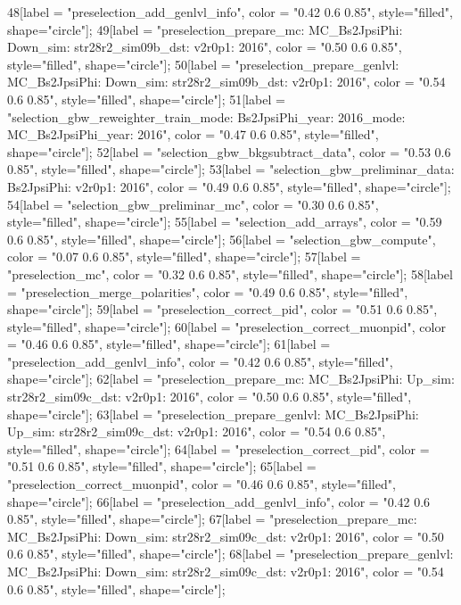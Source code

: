 {	48[label = "preselection_add_genlvl_info", color = "0.42 0.6 0.85", style="filled", shape="circle"];
	49[label = "preselection_prepare_mc\nmode: MC_Bs2JpsiPhi\npolarity: Down\nstrip_sim: str28r2_sim09b_dst\nversion: v2r0p1\nyear: 2016", color = "0.50 0.6 0.85", style="filled", shape="circle"];
	50[label = "preselection_prepare_genlvl\nmode: MC_Bs2JpsiPhi\npolarity: Down\nstrip_sim: str28r2_sim09b_dst\nversion: v2r0p1\nyear: 2016", color = "0.54 0.6 0.85", style="filled", shape="circle"];
	51[label = "selection_gbw_reweighter_train\ndata_mode: Bs2JpsiPhi\ndata_year: 2016\nmc_mode: MC_Bs2JpsiPhi\nmc_year: 2016", color = "0.47 0.6 0.85", style="filled", shape="circle"];
	52[label = "selection_gbw_bkgsubtract_data", color = "0.53 0.6 0.85", style="filled", shape="circle"];
	53[label = "selection_gbw_preliminar_data\nmode: Bs2JpsiPhi\nversion: v2r0p1\nyear: 2016", color = "0.49 0.6 0.85", style="filled", shape="circle"];
	54[label = "selection_gbw_preliminar_mc", color = "0.30 0.6 0.85", style="filled", shape="circle"];
	55[label = "selection_add_arrays", color = "0.59 0.6 0.85", style="filled", shape="circle"];
	56[label = "selection_gbw_compute", color = "0.07 0.6 0.85", style="filled", shape="circle"];
	57[label = "preselection_mc", color = "0.32 0.6 0.85", style="filled", shape="circle"];
	58[label = "preselection_merge_polarities", color = "0.49 0.6 0.85", style="filled", shape="circle"];
	59[label = "preselection_correct_pid", color = "0.51 0.6 0.85", style="filled", shape="circle"];
	60[label = "preselection_correct_muonpid", color = "0.46 0.6 0.85", style="filled", shape="circle"];
	61[label = "preselection_add_genlvl_info", color = "0.42 0.6 0.85", style="filled", shape="circle"];
	62[label = "preselection_prepare_mc\nmode: MC_Bs2JpsiPhi\npolarity: Up\nstrip_sim: str28r2_sim09c_dst\nversion: v2r0p1\nyear: 2016", color = "0.50 0.6 0.85", style="filled", shape="circle"];
	63[label = "preselection_prepare_genlvl\nmode: MC_Bs2JpsiPhi\npolarity: Up\nstrip_sim: str28r2_sim09c_dst\nversion: v2r0p1\nyear: 2016", color = "0.54 0.6 0.85", style="filled", shape="circle"];
	64[label = "preselection_correct_pid", color = "0.51 0.6 0.85", style="filled", shape="circle"];
	65[label = "preselection_correct_muonpid", color = "0.46 0.6 0.85", style="filled", shape="circle"];
	66[label = "preselection_add_genlvl_info", color = "0.42 0.6 0.85", style="filled", shape="circle"];
	67[label = "preselection_prepare_mc\nmode: MC_Bs2JpsiPhi\npolarity: Down\nstrip_sim: str28r2_sim09c_dst\nversion: v2r0p1\nyear: 2016", color = "0.50 0.6 0.85", style="filled", shape="circle"];
	68[label = "preselection_prepare_genlvl\nmode: MC_Bs2JpsiPhi\npolarity: Down\nstrip_sim: str28r2_sim09c_dst\nversion: v2r0p1\nyear: 2016", color = "0.54 0.6 0.85", style="filled", shape="circle"];
}
